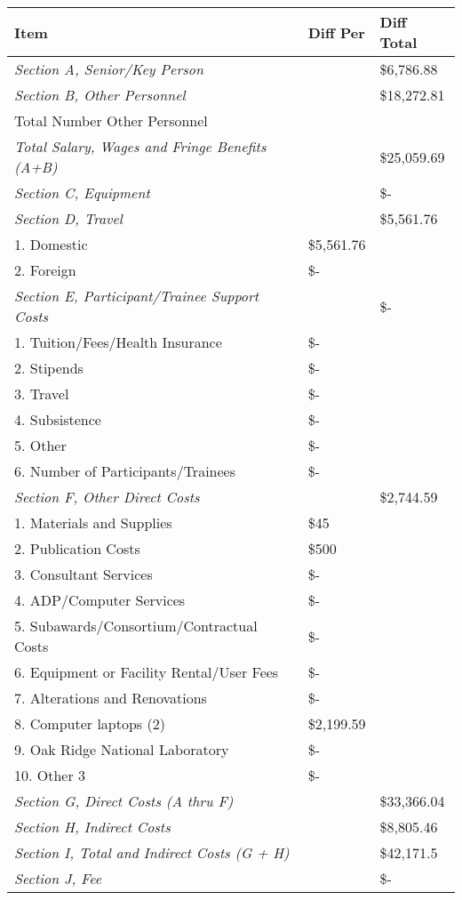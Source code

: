 \documentclass[12pt]{article}
\begin{document}
\begin{tabular}{ | l | l | l | }
\hline
	\textbf{Item} & \textbf{Diff Per} & \textbf{Diff Total} \\ \hline
	\textit{Section A, Senior/Key Person} &  & \$6,786.88 \\ \hline
	\textit{Section B, Other Personnel} &  & \$18,272.81 \\ \hline
	Total Number Other Personnel &  & \  \\ \hline
	\textit{Total Salary, Wages and Fringe Benefits (A+B)} &  & \$25,059.69 \\ \hline
	\textit{Section C, Equipment} &  &  \$-    \\ \hline
	\textit{Section D, Travel} &  & \$5,561.76 \\ \hline
	1.  Domestic & \$5,561.76 & \  \\ \hline
	2.  Foreign &  \$-    & \  \\ \hline
	\textit{Section E, Participant/Trainee Support Costs} & \ &  \$-      \\ \hline
	1.  Tuition/Fees/Health Insurance &  \$-    & \  \\ \hline
	2.  Stipends &  \$-    & \  \\ \hline
	3.  Travel &  \$-    & \  \\ \hline
	4.  Subsistence &  \$-    & \  \\ \hline
	5.  Other &  \$-    & \  \\ \hline
	6.  Number of Participants/Trainees &  \$-    & \  \\ \hline
	\textit{Section F, Other Direct Costs} &  & \$2,744.59 \\ \hline
	1.  Materials and Supplies & \$45 & \  \\ \hline
	2.  Publication Costs & \$500 & \  \\ \hline
	3.  Consultant Services &  \$-    & \  \\ \hline
	4.  ADP/Computer Services &  \$-    & \  \\ \hline
	5.  Subawards/Consortium/Contractual Costs &  \$-    & \  \\ \hline
	6.  Equipment or Facility Rental/User Fees &  \$-    & \  \\ \hline
	7.  Alterations and Renovations &  \$-    & \  \\ \hline
	8.  Computer laptops (2) & \$2,199.59 & \  \\ \hline
	9. Oak Ridge National Laboratory &  \$-    & \  \\ \hline
	10. Other 3 &  \$-    & \  \\ \hline
	\textit{Section G, Direct Costs (A thru F)} &  & \$33,366.04 \\ \hline
	\textit{Section H, Indirect Costs} &  & \$8,805.46 \\ \hline
	\textit{Section I, Total and Indirect Costs (G + H)} &  & \$42,171.5 \\ \hline
	\textit{Section J, Fee }&  &  \$-    \\ \hline
\end{tabular}
\end{document}

